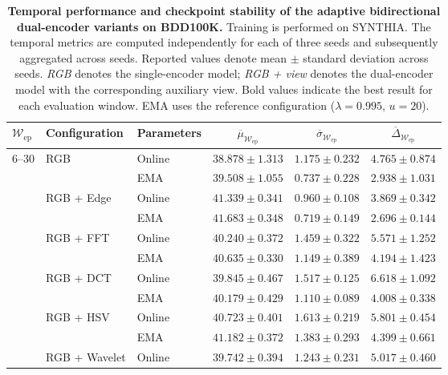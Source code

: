\begin{table}[htbp]
\centering
\caption[SYNTHIA results: adaptive bidirectional dual encoder on BDD100K across evaluation windows]{%
\textbf{Temporal performance and checkpoint stability of the adaptive bidirectional
dual-encoder variants on BDD100K.}
Training is performed on SYNTHIA. The temporal metrics are computed
independently for each of three seeds and subsequently aggregated across
seeds. Reported values denote mean $\pm$ standard deviation across seeds.
\emph{RGB} denotes the single-encoder model; \emph{RGB + view} denotes the
dual-encoder model with the corresponding auxiliary view. Bold values indicate the best result for each evaluation window.
EMA uses the reference configuration ($\lambda=0.995$, $u=20$).}
\label{tab:synthia_dual_adaptive_windows_bdd}
\small
\begin{tabular}{lllccc}
\toprule
$\mathcal{W}_{\mathrm{ep}}$ & Configuration & Parameters
& $\overline{\mu}_{\mathcal{W}_{\mathrm{ep}}}$
& $\overline{\sigma}_{\mathcal{W}_{\mathrm{ep}}}$
& $\overline{\Delta}_{\mathcal{W}_{\mathrm{ep}}}$ \\
\midrule
\multirow{12}{*}{6--30} & \multirow{2}{*}{RGB} & Online & $38.878 \pm 1.313$ & $1.175 \pm 0.232$ & $4.765 \pm 0.874$ \\
 &  & EMA & $39.508 \pm 1.055$ & $0.737 \pm 0.228$ & $2.938 \pm 1.031$ \\
\addlinespace[2pt]
 & \multirow{2}{*}{RGB + Edge} & Online & $41.339 \pm 0.341$ & $0.960 \pm 0.108$ & $3.869 \pm 0.342$ \\
 &  & EMA & $\mathbf{41.683 \pm 0.348}$ & $\mathbf{0.719 \pm 0.149}$ & $\mathbf{2.696 \pm 0.144}$ \\
\addlinespace[2pt]
 & \multirow{2}{*}{RGB + FFT} & Online & $40.240 \pm 0.372$ & $1.459 \pm 0.322$ & $5.571 \pm 1.252$ \\
 &  & EMA & $40.635 \pm 0.330$ & $1.149 \pm 0.389$ & $4.194 \pm 1.423$ \\
\addlinespace[2pt]
 & \multirow{2}{*}{RGB + DCT} & Online & $39.845 \pm 0.467$ & $1.517 \pm 0.125$ & $6.618 \pm 1.092$ \\
 &  & EMA & $40.179 \pm 0.429$ & $1.110 \pm 0.089$ & $4.008 \pm 0.338$ \\
\addlinespace[2pt]
 & \multirow{2}{*}{RGB + HSV} & Online & $40.723 \pm 0.401$ & $1.613 \pm 0.219$ & $5.801 \pm 0.454$ \\
 &  & EMA & $41.182 \pm 0.372$ & $1.383 \pm 0.293$ & $4.399 \pm 0.661$ \\
\addlinespace[2pt]
 & \multirow{2}{*}{RGB + Wavelet} & Online & $39.742 \pm 0.394$ & $1.243 \pm 0.231$ & $5.017 \pm 0.460$ \\

\end{tabular}
\end{table}
